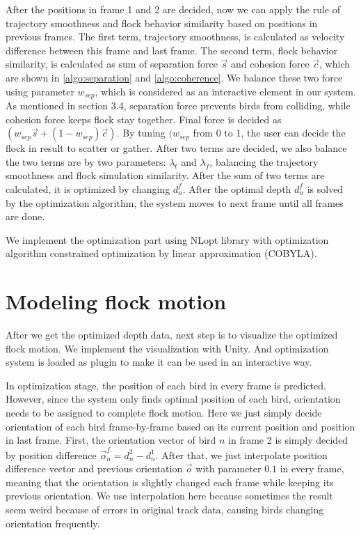 After the positions in frame 1 and 2 are decided, now we can apply the rule of trajectory smoothness and flock behavior similarity based on positions in previous frames. The first term, trajectory smoothness, is calculated as velocity difference between this frame and last frame. The second term, flock behavior similarity, is calculated as sum of separation force $\vec{s}$ and cohesion force $\vec{c}$, which are shown in \ref{algo:separation} and \ref{algo:coherence}. We balance these two force using parameter $w_{sep}$, which is considered as an interactive element in our system. As mentioned in section 3.4, separation force prevents birds from colliding, while cohesion force keeps flock stay together. Final force is decided as $(w_{sep} \vec{s}+(1-w_{sep})\vec{c})$. By tuning $(w_{sep}$ from 0 to 1, the user can decide the flock in result to scatter or gather. After two terms are decided, we also balance the two terms are by two parameters: $\lambda_{t}$ and $\lambda_{f}$, balancing the trajectory smoothness and flock simulation similarity. After the sum of two terms are calculated, it is optimized by changing $d_n^f$. After the optimal depth $d_n^f$ is solved by the optimization algorithm, the system moves to next frame until all frames are done.


We implement the optimization part using NLopt library \cite{NLopt} with optimization algorithm constrained optimization by linear approximation (COBYLA)\cite{COBYLA}.



\section{Modeling flock motion}


After we get the optimized depth data, next step is to visualize the optimized flock motion. We implement the visualization with Unity\cite{Unity}. And optimization system is loaded as plugin to make it can be used in an interactive way.


In optimization stage, the position of each bird in every frame is predicted. However, since the system only finds optimal position of each bird, orientation needs to be assigned to complete flock motion. Here we just simply decide orientation of each bird frame-by-frame based on its current position and position in last frame. First, the orientation vector of bird $n$ in frame 2 is simply decided by position difference $\vec{o}_n^f=d_n^2 - d_n^1$. After that, we just interpolate position difference vector and previous orientation $\vec{o}$ with parameter $0.1$ in every frame, meaning that the orientation is slightly changed each frame while keeping its previous orientation. We use interpolation here because sometimes the result seem weird because of errors in original track data, causing birds changing orientation frequently.


